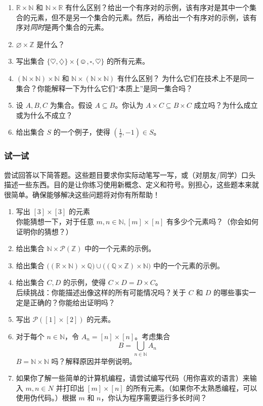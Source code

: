 \begin{enumerate}[label=(\arabic*)]
    \item $\mathbb{R} \times \mathbb{N}$ 和 $\mathbb{N} \times \mathbb{R}$ 有什么区别？给出一个有序对的示例，该有序对是其中一个集合的元素，但不是另一个集合的元素。然后，再给出一个有序对的示例，该有序对\emph{同时}是两个集合的元素。
    \item $\varnothing \times \mathbb{Z}$ 是什么？
    \item 写出集合 $\{\heartsuit, \diamondsuit\} \times \{\smiley{}, \square, \heartsuit\}$ 的所有元素。
    \item $(\mathbb{N} \times \mathbb{N}) \times \mathbb{N}$ 和 $\mathbb{N} \times (\mathbb{N} \times \mathbb{N})$ 有什么区别？ 为什么它们在技术上不是同一集合？你能解释一下为什么它们``本质上''是同一集合吗？
    \item 设 $A,B,C$ 为集合。假设 $A \subseteq B$。你认为 $A \times C \subseteq B \times C$ 成立吗？为什么成立或为什么不成立？
    \item 给出集合 $S$ 的一个例子，使得 $(\frac{1}{2}, -1) \in S$。
\end{enumerate}

\subsubsection*{试一试}

尝试回答以下简答题。这些题目要求你实际动笔写一写，或（对朋友/同学）口头描述一些东西。目的是让你练习使用新概念、定义和符号。别担心，这些题本来就很简单。确保能够解决这些问题将对你有所帮助！

\begin{enumerate}[label=(\arabic*)]
    \item 写出 $[3] \times [3]$ 的元素  \\
    你能猜想一下，对于任意 $m, n \in \mathbb{N}, [m] \times [n]$ 有多少个元素吗？（你会如何证明你的猜想？）
    \item 给出集合 $\mathbb{N} \times \mathcal{P}(\mathbb{Z})$ 中的一个元素的示例。
    \item 给出集合 $\big((\mathbb{R} \times \mathbb{N}) \times \mathbb{Q}\big) \cup \big((\mathbb{Q} \times \mathbb{Z}) \times \mathbb{N}\big)$ 中的一个元素的示例。
    \item 给出集合 $C, D$ 的示例，使得 $C \times D = D \times C$。\\
    后续挑战：你能描述出像这样的所有可能情况吗？关于 $C$ 和 $D$ 的哪些事实一定是正确的？你能给出证明吗？
    \item 写出 $\mathcal{P}([1] \times [2])$ 的元素。
    \item 对于每个 $n \in \mathbb{N}$，令 $A_n = [n] \times [n]$。考虑集合
    \[B = \bigcup_{n \in \mathbb{N}} A_n\]
    $B = \mathbb{N} \times \mathbb{N}$ 吗？解释原因并举例说明。
    \item 如果你了解一些简单的计算机编程，请尝试编写代码（用你喜欢的语言）来输入 $m, n \in N$ 并打印出 $[m] \times [n]$ 的所有元素。（如果你不太熟悉编程，可以使用伪代码。）根据 $m$ 和 $n$，你认为程序需要运行多长时间？
\end{enumerate}